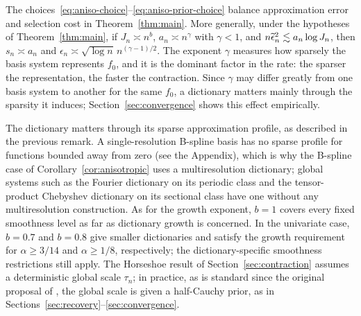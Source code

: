 \begin{remark}\label{rem:polynomial}
The choices~\eqref{eq:aniso-choice}--\eqref{eq:aniso-prior-choice} balance approximation error and selection cost in Theorem~\ref{thm:main}. More generally, under the hypotheses of Theorem~\ref{thm:main}, if $J_n\asymp n^b$, $a_n\asymp n^\gamma$ with $\gamma<1$, and $n\widetilde{\epsilon}_n^2\lesssim a_n\log J_n$, then $s_n\asymp a_n$ and $\epsilon_n\asymp\sqrt{\log n}\,n^{(\gamma-1)/2}$. The exponent $\gamma$ measures how sparsely the basis system represents $f_0$, and it is the dominant factor in the rate: the sparser the representation, the faster the contraction. Since $\gamma$ may differ greatly from one basis system to another for the same $f_0$, a dictionary matters mainly through the sparsity it induces; Section~\ref{sec:convergence} shows this effect empirically.
\end{remark}

\begin{remark}\label{rem:practical}
The dictionary matters through its sparse approximation profile, as described in the previous remark. A single-resolution B-spline basis has no sparse profile for functions bounded away from zero (see the Appendix), which is why the B-spline case of Corollary~\ref{cor:anisotropic} uses a multiresolution dictionary; global systems such as the Fourier dictionary on its periodic class and the tensor-product Chebyshev dictionary on its sectional class have one without any multiresolution construction. As for the growth exponent, $b=1$ covers every fixed smoothness level as far as dictionary growth is concerned. In the univariate case, $b=0.7$ and $b=0.8$ give smaller dictionaries and satisfy the growth requirement for $\alpha\geq3/14$ and $\alpha\geq1/8$, respectively; the dictionary-specific smoothness restrictions still apply. The Horseshoe result of Section~\ref{sec:contraction} assumes a deterministic global scale $\tau_n$; in practice, as is standard since the original proposal of \citet{Carvalho2010}, the global scale is given a half-Cauchy prior, as in Sections~\ref{sec:recovery}--\ref{sec:convergence}.
\end{remark}
